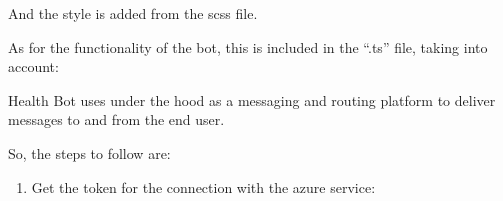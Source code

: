 \documentclass[letterpaper,10pt,english]{sphinxmanual}
\begin{document}
\begin{sphinxVerbatim}[commandchars=\\\{\}]
  
\end{sphinxVerbatim}

And the style is added from the scss file.

As for the functionality of the bot, this is included in the “.ts” file, taking into account:



Health Bot uses  under the hood as a messaging and routing platform to deliver messages to and from the end user.

So, the steps to follow are:
\begin{enumerate}
%
\item {} 
Get the token for the connection with the azure service:

\end{enumerate}
\end{document}
